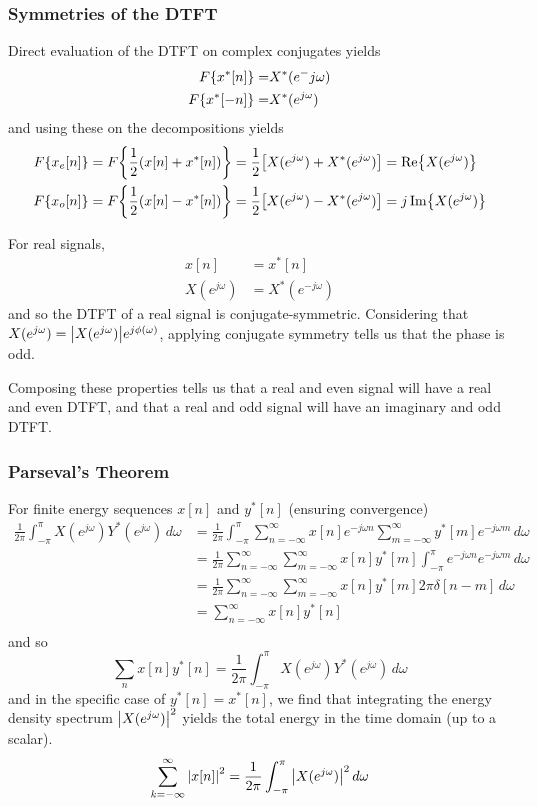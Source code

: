 \documentclass{article}
\newcommand{\jw}{{j\omega}}
\newcommand{\w}{\omega}
\begin{document}
\subsubsection{Symmetries of the DTFT}
Direct evaluation of the DTFT on complex conjugates yields
\begin{align*}
    F\qty{x^*[n]} =& X^*(e^-\jw)\\
    F\qty{x^*[-n]} =& X^*(e^\jw)\\
\end{align*}
and using these on the decompositions yields
\begin{align*}
	F\qty{x_e[n]} &= F\qty{\frac{1}{2}\qty(x[n] + x^*[n])} = \frac{1}{2}\qty[X(e^\jw) + X^*(e^\jw)] = \Re{X(e^\jw)}\\
	F\qty{x_o[n]} &= F\qty{\frac{1}{2}\qty(x[n] - x^*[n])} = \frac{1}{2}\qty[X(e^\jw) - X^*(e^\jw)] = j \Im{X(e^\jw)}
\end{align*}

For real signals,
\begin{align*}
	x[n] &= x^*[n]\\
	X(e^\jw) &= X^*(e^{-\jw})
\end{align*}
and so the DTFT of a real signal is conjugate-symmetric. Considering that $X(e^\jw) = \qty|X(e^\jw)|e^{j\phi(\w)}$, applying conjugate symmetry tells us that the phase is odd.

Composing these properties tells us that a real and even signal will have a real and even DTFT, and that a real and odd signal will have an imaginary and odd DTFT.

\subsubsection{Parseval's Theorem}
For finite energy sequences $x[n]$ and $y^*[n]$ (ensuring convergence)
\begin{align*}
    \frac{1}{2\pi}\int_{-\pi}^\pi X(e^\jw)Y^*(e^\jw)\,d\omega &=
    \frac{1}{2\pi}\int_{-\pi}^\pi \sum_{n=-\infty}^\infty x[n] e^{-\jw n}\sum_{m=-\infty}^\infty y^*[m]e^{-\jw m}\,d\omega\\
        &=
        \frac{1}{2\pi}\sum_{n=-\infty}^\infty \sum_{m=-\infty}^\infty x[n] y^*[m]\int_{-\pi}^\pi e^{-\jw n}e^{-\jw m}\,d\omega\\
        &=
        \frac{1}{2\pi}\sum_{n=-\infty}^\infty \sum_{m=-\infty}^\infty x[n] y^*[m] 2\pi\delta[n-m]\,d\omega\\
        &=
        \sum_{n=-\infty}^\infty x[n] y^*[n]\\
\end{align*}
and so
\[
    \sum_n x[n]y^*[n] = \frac{1}{2\pi}\int_{-\pi}^\pi X(e^\jw)Y^*(e^\jw)\,d\omega
\]
and in the specific case of $y^*[n]=x^*[n]$, we find that integrating the energy density spectrum $\qty|X(e^\jw)|^2$ yields the total energy in the time domain (up to a scalar).
\[
    \sum_{k=-\infty}^\infty \qty|x[n]|^2 = \frac{1}{2\pi}\int_{-\pi}^\pi \qty|X(e^\jw)|^2\,d\w
\]
\end{document}
